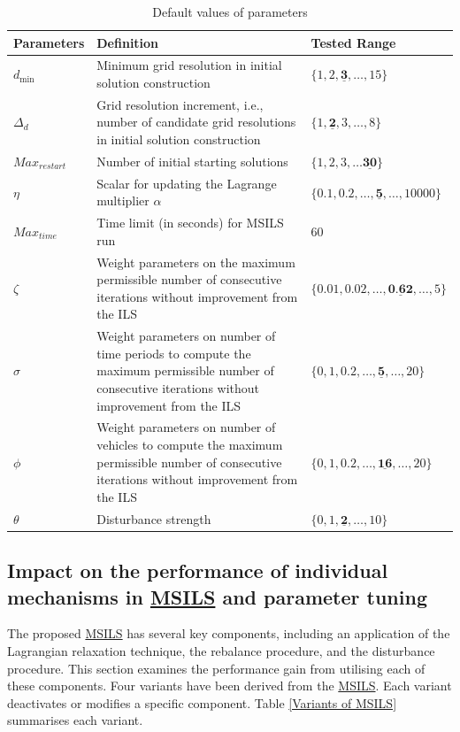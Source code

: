 \documentclass{article}
\begin{document}
\begin{table}[H]
\caption{Default values of parameters}
\label{default parameters}
\centering
\begin{tabular}{ p{2cm}p{8cm}p{5cm}}
\toprule%
\textbf{Parameters} & \textbf{Definition} &\textbf{Tested Range} \tabularnewline
\hline
$d_{\min}$&  Minimum grid resolution in initial solution construction & $\{1,2,\underline{\textbf{3}},\dots,15\}$ \tabularnewline
$\Delta_d$&  Grid resolution increment, i.e., number of candidate grid resolutions in initial solution construction & $\{1,\underline{\textbf{2}},3,\dots,8\}$ \tabularnewline
$Max_{restart}$ &  Number of initial starting solutions & $\{1,2,3,\dots \underline{\textbf{30}}\}$ \tabularnewline
$\eta$ & Scalar for updating the Lagrange multiplier $\alpha$ & $\{ 0.1,0.2,\dots,\underline{\textbf{5}},\dots,10000\}$\tabularnewline
$Max_{time}$ & Time limit (in seconds) for MSILS run & 60 \tabularnewline
$\zeta$ & Weight parameters on the maximum permissible number of consecutive iterations without improvement from the ILS & $\{ 0.01,0.02,\dots,\underline{\textbf{0.62}},\dots,5\}$\tabularnewline 
$\sigma$ & Weight parameters on number of time periods to compute the maximum permissible number of consecutive iterations without improvement from the ILS & $\{0,1,0.2,\dots,\underline{\textbf{5}},\dots,20\}$ \tabularnewline
$\phi$ &  Weight parameters on number of vehicles to compute the maximum permissible number of consecutive iterations without improvement from the ILS & $\{0,1,0.2,\dots,\underline{\textbf{16}},\dots,20\}$ \tabularnewline
$\theta$ & Disturbance strength & $\{0,1,\underline{\textbf{2}},\dots,10\}$ \tabularnewline
\hline\end{tabular}
\end{table}




\subsection{Impact on the performance of individual mechanisms in \hyperref[alg:MSILS]{MSILS} and parameter tuning} \label{sec: tuning}


The proposed \hyperref[alg:MSILS]{MSILS} has several key components, including an application of the Lagrangian relaxation technique, the rebalance procedure, and the disturbance procedure. This section examines the performance gain from utilising each of these components. Four variants have been derived from the \hyperref[alg:MSILS]{MSILS}. Each variant deactivates or modifies a specific component. Table \ref{Variants of MSILS} summarises each variant.
\end{document}

